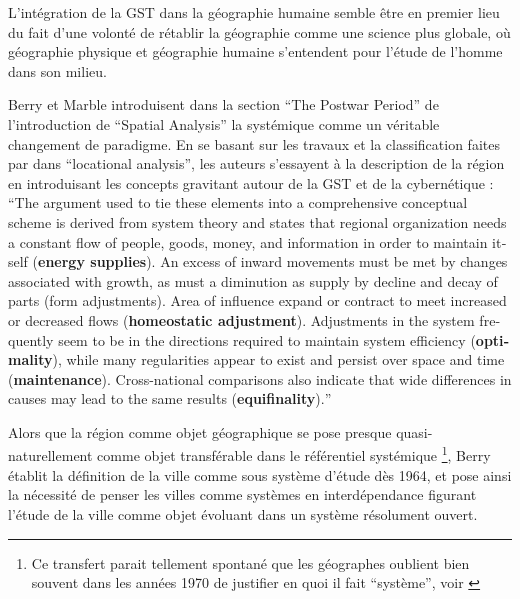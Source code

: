 L'intégration de la GST dans la géographie humaine semble être en premier lieu du fait d'une volonté de rétablir la géographie comme une science plus globale, où géographie physique et géographie humaine s'entendent pour l'étude de l'homme dans son milieu.

Berry et Marble introduisent dans la section \foreignquote{english}{The Postwar Period} de l'introduction de \foreignquote{english}{Spatial Analysis} la systémique comme un véritable changement de paradigme. En se basant sur les travaux et la classification faites par \textcite{Haggett1965} dans \foreignquote{english}{locational analysis}, les auteurs s'essayent à la description de la région en introduisant les concepts gravitant autour de la GST et de la cybernétique : \foreignquote{english}{The argument used to tie these elements into a comprehensive conceptual scheme is derived from system theory and states that regional organization needs a constant flow of people, goods, money, and information in order to maintain itself (\textbf{energy supplies}). An excess of inward movements must be met by changes associated with growth, as must a diminution as supply by decline and decay of parts (form adjustments). Area of influence expand or contract to meet increased or decreased flows (\textbf{homeostatic adjustment}). Adjustments in the system frequently seem to be in the directions required to maintain system efficiency (\textbf{optimality}), while many regularities appear to exist and persist over space and time (\textbf{maintenance}). Cross-national comparisons also indicate that wide differences in causes may lead to the same results (\textbf{equifinality}).}

Alors que la région comme objet géographique se pose presque quasi-naturellement comme objet transférable dans le référentiel systémique \footnote{Ce transfert parait tellement spontané que les géographes oublient bien souvent dans les années 1970 de justifier en quoi il fait \enquote{système}, voir \autocite{Orain2001}}, Berry établit la définition de la ville comme sous système d'étude dès 1964, et pose ainsi la nécessité de penser les villes comme systèmes en interdépendance figurant l'étude de la ville comme objet évoluant dans un système résolument ouvert.

